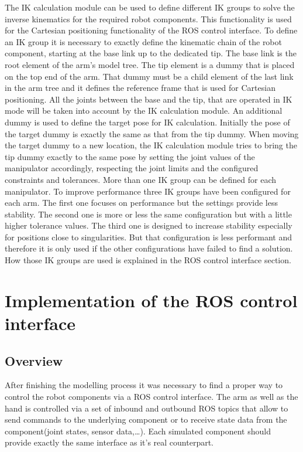 The IK calculation module can be used to define different IK groups to solve the inverse kinematics for the required robot components. This functionality is used for the Cartesian positioning 
functionality of the ROS control interface. To define an IK group it is necessary to exactly define the kinematic chain of the robot component, starting at the base link up to the dedicated tip. The base link is the root element of the arm's model tree. The tip element is a dummy that is placed on the top end of the arm. That dummy must be a child element of the last link in the arm tree and it defines the reference frame that is used for Cartesian positioning. All the joints between the base and the tip, that are operated in IK mode will be taken into account by the IK calculation module. An additional dummy is used to define the target pose for IK calculation. Initially the pose of the target dummy is exactly the same as that from the tip dummy. When moving the target dummy to a new location, the IK calculation module tries to bring the tip dummy exactly to the same pose by setting the joint values of the manipulator accordingly, respecting the joint limits and the configured constraints and tolerances. More than one IK group can be defined for each manipulator. To improve performance three IK groups have been configured for each arm. The first one focuses on performance but the settings provide less stability. The second one is more or less the same configuration but with a little higher tolerance values. The third one is designed to increase stability especially for positions close to singularities. But that configuration is less performant and therefore it is only used if the other configurations have failed to find a solution. How those IK groups are used is explained in the ROS control interface section.

\section{Implementation of the ROS control interface}

\subsection{Overview}

After finishing the modelling process it was necessary to find a proper way to control the robot components via a ROS control interface. The arm as well as the hand is controlled via a set of inbound and outbound ROS topics that allow to send commands to the underlying component or to receive state data from the component(joint states, sensor data,\ldots). Each simulated component should provide exactly the same interface as it's real counterpart.

